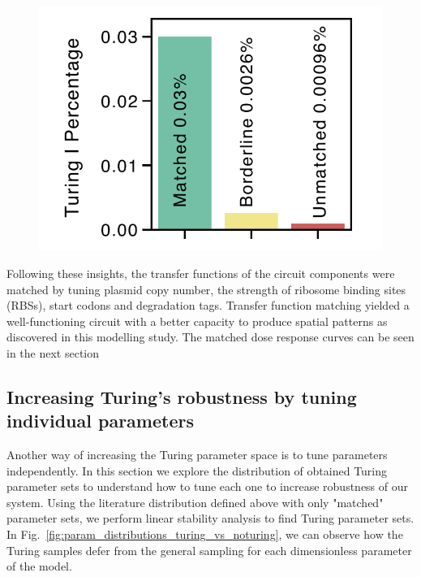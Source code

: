 \begin{figure}[H]
    \centering
    \includegraphics[width=1\textwidth]{chapters/Chapter 2/balancing_robustness}
    \caption[]{\textbf{} } %
    \label{fig:balancing_robustness}
\end{figure}

Following these insights, the transfer functions of the circuit components were matched by tuning plasmid copy number, the strength of ribosome binding sites (RBSs), start codons and degradation tags. %
Transfer function matching yielded a well-functioning circuit with a better capacity to produce spatial patterns as discovered in this modelling study.
The matched dose response curves can be seen in the next section %



\subsection{Increasing Turing's robustness by tuning individual parameters}
Another way of increasing the Turing parameter space is to tune parameters independently.
In this section we explore the distribution of obtained Turing parameter sets to understand how to tune each one to increase robustness of our system.
Using the literature distribution defined above with only "matched" parameter sets, we perform linear stability analysis to find Turing parameter sets.
In Fig.~\ref{fig:param_distributions_turing_vs_noturing}, we can observe how the Turing samples defer from the general sampling for each dimensionless parameter of the model.

